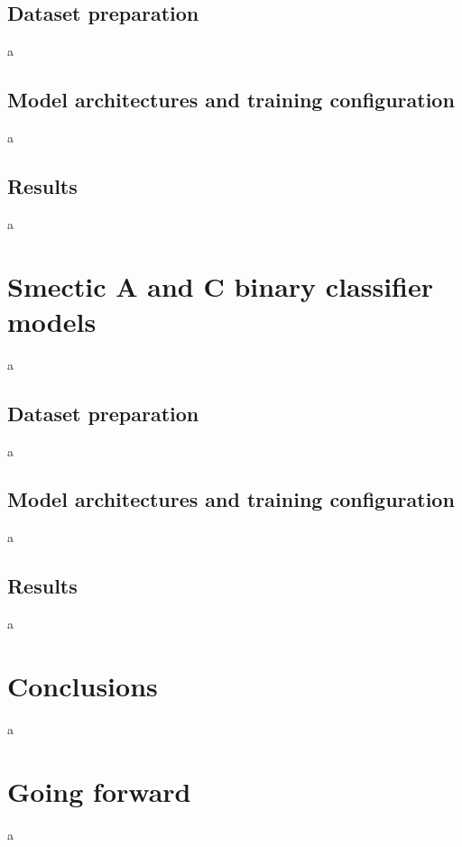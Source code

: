\documentclass[12pt]{article}
\begin{document}
\subsection{Dataset preparation}
a
\subsection{Model architectures and training configuration}
a
\subsection{Results}
a
\section{Smectic A and C binary classifier models}
a
\subsection{Dataset preparation}
a
\subsection{Model architectures and training configuration}
a
\subsection{Results}
a
\section{Conclusions}
a
\section{Going forward}
a


\end{document}
